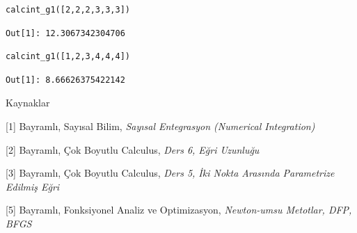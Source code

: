 \documentclass[12pt,fleqn]{article}\usepackage{../../common}
\begin{document}
\begin{verbatim}
calcint_g1([2,2,2,3,3,3])
\end{verbatim}

\begin{verbatim}
Out[1]: 12.3067342304706
\end{verbatim}

\begin{verbatim}
calcint_g1([1,2,3,4,4,4])
\end{verbatim}

\begin{verbatim}
Out[1]: 8.66626375422142
\end{verbatim}



Kaynaklar 

[1] Bayramlı, Sayısal Bilim, {\em Sayısal Entegrasyon (Numerical Integration)}

[2] Bayramlı, Çok Boyutlu Calculus, {\em Ders 6, Eğri Uzunluğu}

[3] Bayramlı, Çok Boyutlu Calculus, {\em Ders 5, İki Nokta Arasında Parametrize Edilmiş Eğri}

[5] Bayramlı, Fonksiyonel Analiz ve Optimizasyon, {\em Newton-umsu Metotlar, DFP, BFGS }
\end{document}
